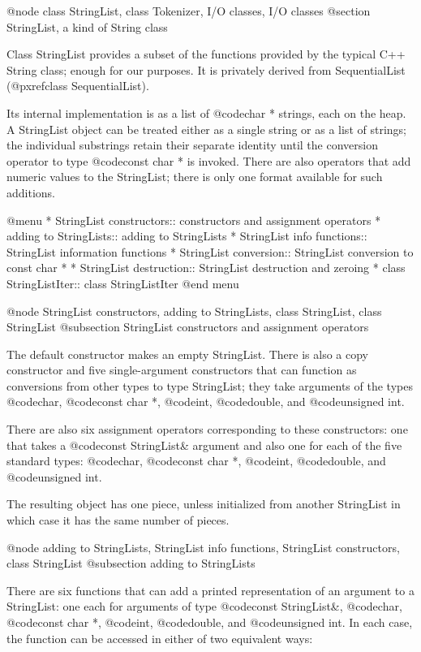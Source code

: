 @node class StringList, class Tokenizer, I/O classes, I/O classes
@section StringList, a kind of String class

Class StringList provides a subset of the functions provided by the
typical C++ String class; enough for our purposes.  It is privately
derived from SequentialList (@pxref{class SequentialList}).

Its internal implementation is as a
list of @code{char *} strings, each on the heap.  A StringList
object can be treated either as a single string or as a list of
strings; the individual substrings retain their separate identity
until the conversion operator to type @code{const char *} is invoked.
There are also operators that add numeric values to the StringList;
there is only one format available for such additions.

@menu
* StringList constructors::     constructors and assignment operators
* adding to StringLists::       adding to StringLists
* StringList info functions::   StringList information functions
* StringList conversion::       StringList conversion to const char *
* StringList destruction::      StringList destruction and zeroing
* class StringListIter::        class StringListIter
@end menu

@node StringList constructors, adding to StringLists, class StringList, class StringList
@subsection StringList constructors and assignment operators

The default constructor makes an empty StringList.  There is also
a copy constructor and five single-argument constructors that can
function as conversions from other types to type StringList; they
take arguments of the types
@code{char}, @code{const char *}, @code{int}, @code{double}, and
@code{unsigned int}.

There are also six assignment operators corresponding to these
constructors: one that takes a @code{const StringList&} argument and
also one for each of the five standard types:
@code{char}, @code{const char *}, @code{int}, @code{double}, and
@code{unsigned int}.

The resulting object has one piece, unless initialized from another
StringList in which case it has the same number of pieces.

@node adding to StringLists, StringList info functions, StringList constructors, class StringList
@subsection adding to StringLists

There are six functions that can add a printed representation of an
argument to a StringList: one each for arguments of type
@code{const StringList&}, @code{char}, @code{const char *}, @code{int},
@code{double}, and @code{unsigned int}.  In each case, the function
can be accessed in either of two equivalent ways:

